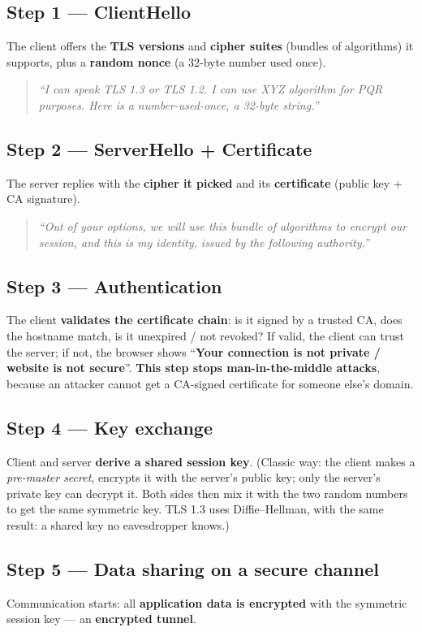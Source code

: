 \subsection*{Step 1 --- ClientHello}
The client offers the \textbf{TLS versions} and \textbf{cipher suites} (bundles of algorithms) it supports, plus a \textbf{random nonce} (a 32-byte number used once).
\begin{quote}\emph{``I can speak TLS 1.3 or TLS 1.2. I can use XYZ algorithm for PQR purposes. Here is a number-used-once, a 32-byte string.''}\end{quote}

\subsection*{Step 2 --- ServerHello + Certificate}
The server replies with the \textbf{cipher it picked} and its \textbf{certificate} (public key + CA signature).
\begin{quote}\emph{``Out of your options, we will use this bundle of algorithms to encrypt our session, and this is my identity, issued by the following authority.''}\end{quote}

\subsection*{Step 3 --- Authentication}
The client \textbf{validates the certificate chain}: is it signed by a trusted CA, does the hostname match, is it unexpired / not revoked? If valid, the client can trust the server; if not, the browser shows ``\textbf{Your connection is not private / website is not secure}''. \textbf{This step stops man-in-the-middle attacks}, because an attacker cannot get a CA-signed certificate for someone else's domain.

\subsection*{Step 4 --- Key exchange}
Client and server \textbf{derive a shared session key}. (Classic way: the client makes a \emph{pre-master secret}, encrypts it with the server's public key; only the server's private key can decrypt it. Both sides then mix it with the two random numbers to get the same symmetric key. TLS 1.3 uses Diffie--Hellman, with the same result: a shared key no eavesdropper knows.)

\subsection*{Step 5 --- Data sharing on a secure channel}
Communication starts: all \textbf{application data is encrypted} with the symmetric session key --- an \textbf{encrypted tunnel}.


